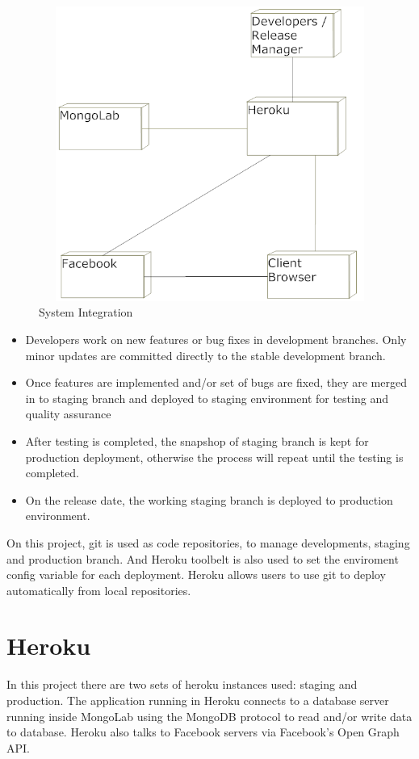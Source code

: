 \vspace{3em}
\begin{figure}[H]
\begin{center}
\includegraphics[height=3.8in,width=6.5in]{images/systemIntegration.png}
\caption{System Integration}
\label{fig:system-integration}
\end{center}
\end{figure}

\begin{itemize}
\item Developers work on new features or bug fixes in development branches. Only minor updates are committed directly to the stable development branch.
\item Once features are implemented and/or set of bugs are fixed, they are merged in to staging branch and deployed to staging environment for testing and quality assurance
\item After testing is completed, the snapshop of staging branch is kept for production deployment, otherwise the process will repeat until the testing is completed.
\item On the release date, the working staging branch is deployed to production environment.
\end{itemize}

On this project, git is used as code repositories, to manage developments, staging and production branch. And Heroku toolbelt is also used to set the enviroment config variable for each deployment. Heroku allows users to use git to deploy automatically from local repositories. 
 
\section{Heroku}
In this project there are two sets of heroku instances used: staging and production. 
The application running in Heroku connects to a database server running inside MongoLab using the MongoDB protocol to read and/or write data to database.  Heroku also talks to Facebook servers via Facebook's Open Graph API.

